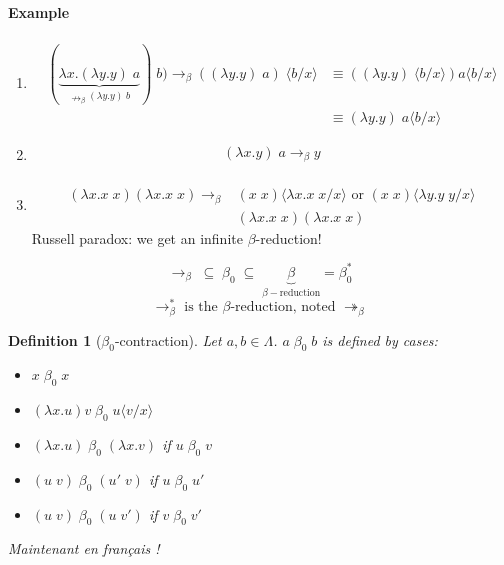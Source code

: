 \documentclass{article}
\newtheorem{defi}{Definition}
\newcommand\subst[2]{\langle #1\big/#2\rangle}
\begin{document}
\paragraph{Example}
\begin{enumerate}
\item \begin{align*}
(\underbrace{\lambda x. (\lambda y.y)\; a}_{\nrightarrow_\beta (\lambda y.y)\; b})\; b) \to_\beta ((\lambda y.y)\; a)\;\subst{b}{x} & \equiv ((\lambda y.y)\;\subst{b}{x})a\subst{b}{x}\\
& \equiv (\lambda y.y)\; a\subst{b}{x}
\end{align*}

\item \begin{align*}
(\lambda x.y)\; a \to_\beta y\\
\end{align*}

\item \begin{align*}
(\lambda x.x\; x)(\lambda x.x \;x) \to_\beta & (x\; x)\subst{\lambda x.x \; x}{x} \text{ or } (x\; x)\subst{\lambda y.y \; y}{x}\\
& (\lambda x. x\;x)(\lambda x.x\; x)
\end{align*}
Russell paradox: we get an infinite $\beta$-reduction!
\end{enumerate}

\[\to_\beta \; \subseteq \; \beta_0 \; \subseteq \; \underbrace{\beta}_{\beta-\text{reduction}} = \beta_0^* \]
\[\to_\beta^* \text{ is the $\beta$-reduction, noted } \twoheadrightarrow_\beta \]

\begin{defi}[$\beta_0$-contraction]
Let $a,b\in \Lambda$. $a\; \beta_0 \; b$ is defined by cases:
\begin{itemize}
\item $x\; \beta_0 \; x$
\item $(\lambda x.u)v\; \beta_0 \; u\subst{v}{x}$
\item $(\lambda x.u)\; \beta_0 \; (\lambda x.v)$ if $u\; \beta_0 \; v$
\item $(u\; v)\; \beta_0 \; (u'\; v)$ if $u\;\beta_0\;u'$
\item $(u\; v)\; \beta_0 \; (u\;v')$ if $v\; \beta_0 \; v'$
\end{itemize}
\end{defi}

\noindent\textit{Maintenant en français !}
\end{document}
